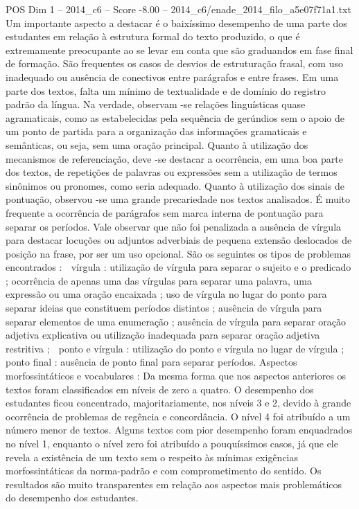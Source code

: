 \begin{textsample}{POS Dim 1 – 2014\_c6 – Score -8.00 – 2014\_c6/enade\_2014\_filo\_a5e07f71a1.txt}
Um importante aspecto a destacar é o baixíssimo desempenho de uma parte dos estudantes em relação à estrutura formal do texto produzido, o que é extremamente preocupante ao se levar em conta que são graduandos em fase final de formação.
São frequentes os casos de desvios de estruturação frasal, com uso inadequado ou ausência de conectivos entre parágrafos e entre frases.
Em uma parte dos textos, falta um mínimo de textualidade e de domínio do registro padrão da língua.
Na verdade, observam -se relações linguísticas quase agramaticais, como as estabelecidas pela sequência de gerúndios sem o apoio de um ponto de partida para a organização das informações gramaticais e semânticas, ou seja, sem uma oração principal.
Quanto à utilização dos mecanismos de referenciação, deve -se destacar a ocorrência, em uma boa parte dos textos, de repetições de palavras ou expressões sem a utilização de termos sinônimos ou pronomes, como seria adequado.
Quanto à utilização dos sinais de pontuação, observou -se uma grande precariedade nos textos analisados.
É muito frequente a ocorrência de parágrafos sem marca interna de pontuação para separar os períodos.
Vale observar que não foi penalizada a ausência de vírgula para destacar locuções ou adjuntos adverbiais de pequena extensão deslocados de posição na frase, por ser um uso opcional.
São os seguintes os tipos de problemas encontrados :  vírgula : utilização de vírgula para separar o sujeito e o predicado ; ocorrência de apenas uma das vírgulas para separar uma palavra, uma expressão ou uma oração encaixada ; uso de vírgula no lugar do ponto para separar ideias que constituem períodos distintos ; ausência de vírgula para separar elementos de uma enumeração ; ausência de vírgula para separar oração adjetiva explicativa ou utilização inadequada para separar oração adjetiva restritiva ;  ponto e vírgula : utilização do ponto e vírgula no lugar de vírgula ;  ponto final : ausência de ponto final para separar períodos.
Aspectos morfossintáticos e vocabulares : Da mesma forma que nos aspectos anteriores os textos foram classificados em níveis de zero a quatro.
O desempenho dos estudantes ficou concentrado, majoritariamente, nos níveis 3 e 2, devido à grande ocorrência de problemas de regência e concordância.
O nível 4 foi atribuído a um número menor de textos.
Alguns textos com pior desempenho foram enquadrados no nível 1, enquanto o nível zero foi atribuído a pouquíssimos casos, já que ele revela a existência de um texto sem o respeito às mínimas exigências morfossintáticas da norma-padrão e com comprometimento do sentido.
Os resultados são muito transparentes em relação aos aspectos mais problemáticos do desempenho dos estudantes.

\end{textsample}

